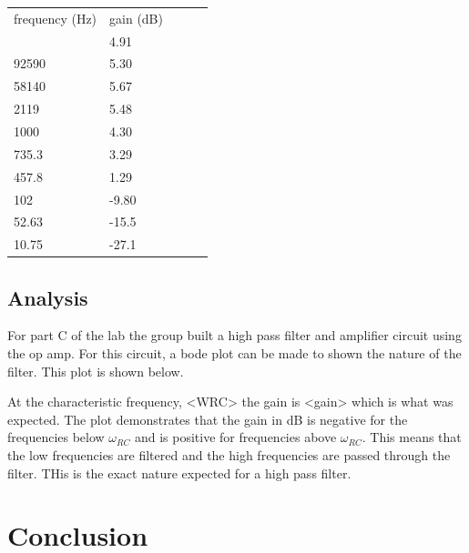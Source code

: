 \documentclass[twocolumn, amsmath]{revtex4}
\begin{document}
\begin{center}
	\begin{ruledtabular}
    \begin{tabular}{ l l l l l }
	frequency (Hz) & gain (dB) \\ \colrule
	102000 & 4.91 \\
	92590 & 5.30  \\
	58140 & 5.67 \\
	2119 & 5.48 \\
	1000 & 4.30 \\
	735.3 & 3.29 \\
	457.8 & 1.29 \\
	102 & -9.80 \\
	52.63 & -15.5 \\
	10.75 & -27.1 \\
\end{tabular}
    \end{ruledtabular}
\end{center}



\subsection{Analysis}

For part C of the lab the group built a high pass filter and amplifier circuit using the op amp. For this circuit, a bode plot can be made to shown the nature of the filter. This plot is shown below.

At the characteristic frequency, <WRC> the gain is <gain> which is what was expected. The plot demonstrates that the gain in dB is negative for the frequencies below $\omega_{RC}$ and is positive for frequencies above $\omega_{RC}$. This means that the low frequencies are filtered and the high frequencies are passed through the filter. THis is the exact nature expected for a high pass filter.

\section{Conclusion}
\end{document}

